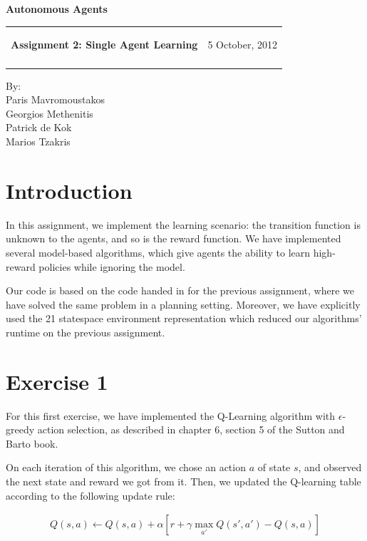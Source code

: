 \documentclass[a4paper,11pt]{article}
\makeatletter
\newcommand{\resheading}[1]{{\large \colorbox{mygrey}{\begin{minipage}{\textwidth}{\textbf{#1 \vphantom{p\^{E}}}}\end{minipage}}}}
\newcommand{\mywebheader}{
  \begin{tabular}{@{}p{5in}p{4in}}
  {\resheading{Assignment 2: Single Agent Learning}} & {\Large 5 October, 2012}\\\vspace{0.2cm}
  \end{tabular}}
\makeatother
\begin{document}
\begin{center}
{\LARGE \textbf{Autonomous Agents}}\\ [1em]
\end{center}
\mywebheader

\begin{center}
{\Large By:} \\ \vspace{0.1cm}
{\Large Paris Mavromoustakos} \\  \vspace{0.1cm}
{\Large Georgios Methenitis} \\ \vspace{0.1cm}
{\Large Patrick de Kok} \\ \vspace{0.1cm}
{\Large Marios Tzakris}
\end{center}




\section*{Introduction}

In this assignment, we implement the learning scenario: the transition function is unknown to the agents, and so is the reward function. We have implemented several model-based algorithms, which give agents the ability to learn high-reward policies while ignoring the model.  

Our code is based on the code handed in for the previous assignment, where we have solved the same problem in a planning setting.  Moreover, we have explicitly used the 21 statespace environment representation which reduced our algorithms' runtime on the previous assignment.


\section*{Exercise 1}

For this first exercise, we have implemented the Q-Learning algorithm with $\epsilon$-greedy action selection, as described in chapter 6, section 5 of the Sutton and Barto book.

On each iteration of this algorithm, we chose an action $a$ of state $s$, and observed the next state and reward we got from it. Then, we updated the Q-learning table according to the following update rule:  

\begin{align*}
  Q(s,a) \leftarrow  Q(s,a) + \alpha \left[ r + \gamma  \max_{a'} Q(s',a') - Q(s,a)\right]
\end{align*}
\end{document}
